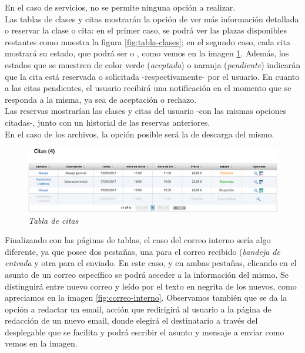 En el caso de servicios, no se permite ninguna opción a realizar. \\

Las tablas de clases y citas mostrarán la opción de ver más información detallada o reservar la clase o cita: en el primer caso, se podrá ver las plazas disponibles restantes como muestra la figura \ref{fig:tabla-clases}; en el segundo caso, cada cita mostrará su estado, que podrá ser  o , como vemos en la imagen \ref{fig:tabla-citas}. Además, los estados que se muestren de color verde (\textit{aceptada}) o naranja (\textit{pendiente}) indicarán que la cita está reservada o solicitada -respectivamente- por el usuario. En cuanto a las citas pendientes, el usuario recibirá una notificación en el momento que se responda a la misma, ya sea de aceptación o rechazo. \\

Las reservas mostrarían las clases y citas del usuario -con las mismas opciones citadas-, junto con un historial de las reservas anteriores. \\

En el caso de los archivos, la opción posible será la de descarga del mismo. 

\begin{figure}
\centering
  \includegraphics[scale=.70]{img/manual/tabla-citas.jpg}
  \caption{\textit{Tabla de citas}}
  \label{fig:tabla-citas}
\end{figure}

Finalizando con las páginas de tablas, el caso del correo interno sería algo diferente, ya que posee dos pestañas, una para el correo recibido (\textit{bandeja de entrada} y otra para el enviado. En este caso, y en ambas pestañas, clicando en el asunto de un correo específico se podrá acceder a la información del mismo. Se distinguirá entre nuevo correo y leído por el texto en negrita de los nuevos, como apreciamos en la imagen \ref{fig:correo-interno}. Observamos también que se da la opción a redactar un email, acción que redirigirá al usuario a la página de redacción de un nuevo email, donde elegirá el destinatario a través del desplegable que se facilita y podrá escribir el asunto y mensaje a enviar como vemos en la imagen. 

